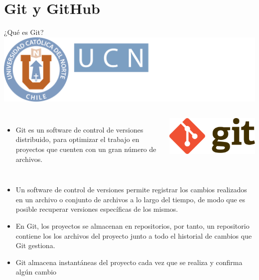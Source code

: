 \documentclass[12pt,a4paper,usenames,x11names,compress]{beamer}
\begin{document}
\section{Git y GitHub}
\begin{frame}{¿Qué es Git? \hfill \includegraphics[scale=.1]{eciem.png}}
\begin{columns}
 \begin{itemize}
 \justifying
    \item Git es un software de control de versiones distribuido, para optimizar el trabajo en proyectos que cuenten con un gran número de archivos.
 \end{itemize}

\includegraphics[scale=.1]{git.png}  
\end{columns}
\begin{itemize}
\justifying
\item Un software de control de versiones permite registrar los cambios realizados en un archivo o conjunto de archivos a lo largo del tiempo, de modo que es posible recuperar versiones específicas de los mismos.
\item En Git, los proyectos se almacenan en repositorios, por tanto, un repositorio contiene los  los archivos del proyecto junto a todo el historial de cambios que Git gestiona. 
\item Git almacena instantáneas del proyecto cada vez que se realiza y confirma algún cambio
\end{itemize}
\end{frame}
\end{document}

